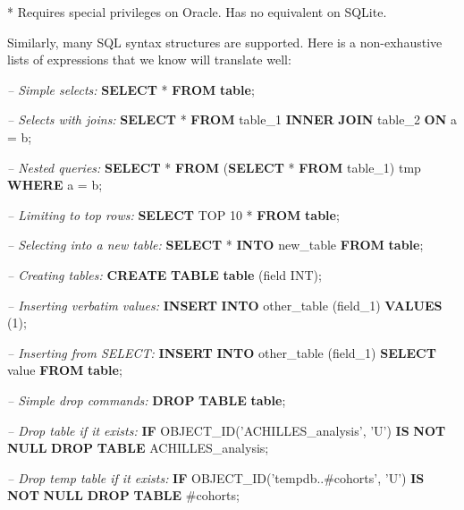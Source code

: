 \documentclass[11pt]{book}
\newenvironment{Shaded}{\begin{snugshade}}{\end{snugshade}}
\newcommand{\KeywordTok}[1]{\textcolor[rgb]{0.13,0.29,0.53}{\textbf{#1}}}
\newcommand{\DataTypeTok}[1]{\textcolor[rgb]{0.13,0.29,0.53}{#1}}
\newcommand{\DecValTok}[1]{\textcolor[rgb]{0.00,0.00,0.81}{#1}}
\newcommand{\StringTok}[1]{\textcolor[rgb]{0.31,0.60,0.02}{#1}}
\newcommand{\CommentTok}[1]{\textcolor[rgb]{0.56,0.35,0.01}{\textit{#1}}}
\newcommand{\FunctionTok}[1]{\textcolor[rgb]{0.00,0.00,0.00}{#1}}
\newcommand{\NormalTok}[1]{#1}
\begin{document}
* Requires special privileges on Oracle. Has no equivalent on SQLite.

Similarly, many SQL syntax structures are supported. Here is a
non-exhaustive lists of expressions that we know will translate well:

\begin{Shaded}
\begin{Highlighting}[]
\CommentTok{-- Simple selects:}
\KeywordTok{SELECT}\NormalTok{ * }\KeywordTok{FROM} \KeywordTok{table}\NormalTok{;}

\CommentTok{-- Selects with joins:}
\KeywordTok{SELECT}\NormalTok{ * }\KeywordTok{FROM}\NormalTok{ table_1 }\KeywordTok{INNER} \KeywordTok{JOIN}\NormalTok{ table_2 }\KeywordTok{ON}\NormalTok{ a = b;}

\CommentTok{-- Nested queries:}
\KeywordTok{SELECT}\NormalTok{ * }\KeywordTok{FROM}\NormalTok{ (}\KeywordTok{SELECT}\NormalTok{ * }\KeywordTok{FROM}\NormalTok{ table_1) tmp }\KeywordTok{WHERE}\NormalTok{ a = b;}

\CommentTok{-- Limiting to top rows:}
\KeywordTok{SELECT}\NormalTok{ TOP }\DecValTok{10}\NormalTok{ * }\KeywordTok{FROM} \KeywordTok{table}\NormalTok{;}

\CommentTok{-- Selecting into a new table:}
\KeywordTok{SELECT}\NormalTok{ * }\KeywordTok{INTO}\NormalTok{ new_table }\KeywordTok{FROM} \KeywordTok{table}\NormalTok{;}

\CommentTok{-- Creating tables:}
\KeywordTok{CREATE} \KeywordTok{TABLE} \KeywordTok{table}\NormalTok{ (field }\DataTypeTok{INT}\NormalTok{);}

\CommentTok{-- Inserting verbatim values:}
\KeywordTok{INSERT} \KeywordTok{INTO}\NormalTok{ other_table (field_1) }\KeywordTok{VALUES}\NormalTok{ (}\DecValTok{1}\NormalTok{);}

\CommentTok{-- Inserting from SELECT:}
\KeywordTok{INSERT} \KeywordTok{INTO}\NormalTok{ other_table (field_1) }\KeywordTok{SELECT} \FunctionTok{value} \KeywordTok{FROM} \KeywordTok{table}\NormalTok{;}
  
\CommentTok{-- Simple drop commands:}
\KeywordTok{DROP} \KeywordTok{TABLE} \KeywordTok{table}\NormalTok{;}

\CommentTok{-- Drop table if it exists:}
\KeywordTok{IF}\NormalTok{ OBJECT_ID(}\StringTok{'ACHILLES_analysis'}\NormalTok{, }\StringTok{'U'}\NormalTok{) }\KeywordTok{IS} \KeywordTok{NOT} \KeywordTok{NULL}
  \KeywordTok{DROP} \KeywordTok{TABLE}\NormalTok{ ACHILLES_analysis;}
  
\CommentTok{-- Drop temp table if it exists:}
\KeywordTok{IF}\NormalTok{ OBJECT_ID(}\StringTok{'tempdb..#cohorts'}\NormalTok{, }\StringTok{'U'}\NormalTok{) }\KeywordTok{IS} \KeywordTok{NOT} \KeywordTok{NULL}
  \KeywordTok{DROP} \KeywordTok{TABLE}\NormalTok{ #cohorts;  }


\end{Highlighting}
\end{Shaded}
\end{document}
